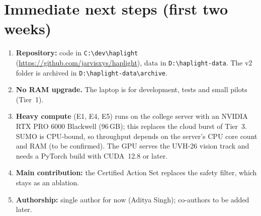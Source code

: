 \documentclass[11pt,a4paper]{article}
\begin{document}
\section{Immediate next steps (first two weeks)}
\label{sec:next}
\begin{keybox}
\begin{enumerate}[leftmargin=*]
\item \textbf{Repository:} code in \texttt{C:\textbackslash dev\textbackslash haplight}
      (\url{https://github.com/jarvisxys/haplight}), data in
      \texttt{D:\textbackslash haplight-data}. The v2 folder is archived in
      \texttt{D:\textbackslash haplight-data\textbackslash archive}.
\item \textbf{No RAM upgrade.} The laptop is for development, tests and small pilots (Tier~1).
\item \textbf{Heavy compute} (E1, E4, E5) runs on the college server with an NVIDIA RTX PRO
      6000 Blackwell (96\,GB); this replaces the cloud burst of Tier~3. SUMO is CPU-bound, so
      throughput depends on the server's CPU core count and RAM (to be confirmed). The GPU
      serves the UVH-26 vision track and needs a PyTorch build with CUDA~12.8 or later.
\item \textbf{Main contribution:} the Certified Action Set replaces the safety filter, which
      stays as an ablation.
\item \textbf{Authorship:} single author for now (Aditya Singh); co-authors to be added later.
\end{enumerate}
\end{keybox}
\end{document}
